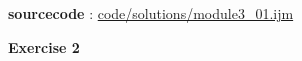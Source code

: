 \textbf{sourcecode} : \href{http://www.example.com/contents}{code/solutions/module3\_01.ijm}
\item \textbf{Exercise 2}